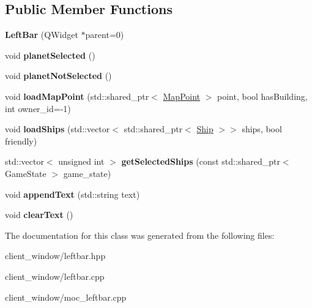 \subsection*{Public Member Functions}
\begin{DoxyCompactItemize}
\item 
{\bfseries Left\+Bar} (Q\+Widget $\ast$parent=0)\hypertarget{classLeftBar_af92e99cffc3f857048efa828ef168275}{}\label{classLeftBar_af92e99cffc3f857048efa828ef168275}

\item 
void {\bfseries planet\+Selected} ()\hypertarget{classLeftBar_afaa039120f8bb8f02f856a14ac677df3}{}\label{classLeftBar_afaa039120f8bb8f02f856a14ac677df3}

\item 
void {\bfseries planet\+Not\+Selected} ()\hypertarget{classLeftBar_af56038978c9a47606012abc0cd4dff2b}{}\label{classLeftBar_af56038978c9a47606012abc0cd4dff2b}

\item 
void {\bfseries load\+Map\+Point} (std\+::shared\+\_\+ptr$<$ \hyperlink{classMapPoint}{Map\+Point} $>$ point, bool has\+Building, int owner\+\_\+id=-\/1)\hypertarget{classLeftBar_a57f401cc62c899fc3c3559d8954256c1}{}\label{classLeftBar_a57f401cc62c899fc3c3559d8954256c1}

\item 
void {\bfseries load\+Ships} (std\+::vector$<$ std\+::shared\+\_\+ptr$<$ \hyperlink{classShip}{Ship} $>$$>$ ships, bool friendly)\hypertarget{classLeftBar_ac767661c7f477c4b0eae7c15bd2fab0e}{}\label{classLeftBar_ac767661c7f477c4b0eae7c15bd2fab0e}

\item 
std\+::vector$<$ unsigned int $>$ {\bfseries get\+Selected\+Ships} (const std\+::shared\+\_\+ptr$<$ Game\+State $>$ game\+\_\+state)\hypertarget{classLeftBar_ae9d70c20007cfec7b5d3ab39aa68a575}{}\label{classLeftBar_ae9d70c20007cfec7b5d3ab39aa68a575}

\item 
void {\bfseries append\+Text} (std\+::string text)\hypertarget{classLeftBar_a0cf867d0d1ff61bbf965255c44c992ea}{}\label{classLeftBar_a0cf867d0d1ff61bbf965255c44c992ea}

\item 
void {\bfseries clear\+Text} ()\hypertarget{classLeftBar_ac3d2665391b2b2be7c22246719e3a276}{}\label{classLeftBar_ac3d2665391b2b2be7c22246719e3a276}

\end{DoxyCompactItemize}


The documentation for this class was generated from the following files\+:\begin{DoxyCompactItemize}
\item 
client\+\_\+window/leftbar.\+hpp\item 
client\+\_\+window/leftbar.\+cpp\item 
client\+\_\+window/moc\+\_\+leftbar.\+cpp\end{DoxyCompactItemize}

